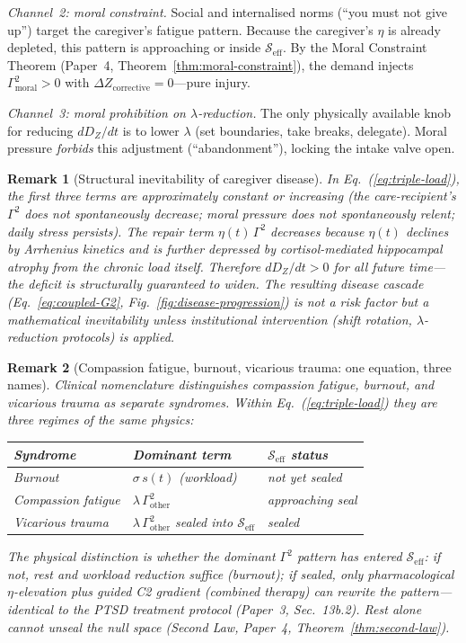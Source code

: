 \documentclass[aps,pre,twocolumn,superscriptaddress,floatfix]{revtex4-2}
\newtheorem{remark}{Remark}
\begin{document}
\emph{Channel~2: moral constraint.}
Social and internalised norms (``you must not give up'')
target the caregiver's fatigue pattern.
Because the caregiver's $\eta$ is already depleted,
this pattern is approaching or inside
$\mathcal{S}_{\text{eff}}$.
By the Moral Constraint Theorem
(Paper~4, Theorem~\ref{thm:moral-constraint}),
the demand injects $\Gamma_{\text{moral}}^2>0$
with $\Delta Z_{\text{corrective}}=0$---pure injury.

\emph{Channel~3: moral prohibition on $\lambda$-reduction.}
The only physically available knob for reducing
$dD_Z/dt$ is to lower $\lambda$ (set boundaries,
take breaks, delegate).
Moral pressure \emph{forbids} this adjustment
(``abandonment''), locking the intake valve open.

\begin{remark}[Structural inevitability of caregiver
disease]
\label{rem:caregiver-inevitable}
In Eq.~(\ref{eq:triple-load}), the first three terms
are approximately constant or increasing (the
care-recipient's $\Gamma^2$ does not spontaneously
decrease; moral pressure does not spontaneously relent;
daily stress persists).
The repair term $\eta(t)\,\Gamma^2$ decreases because
$\eta(t)$ declines by Arrhenius kinetics
and is further depressed by cortisol-mediated
hippocampal atrophy from the chronic load itself.
Therefore $dD_Z/dt > 0$ for all future time---the deficit
is \emph{structurally guaranteed} to widen.
The resulting disease cascade
(Eq.~\ref{eq:coupled-G2}, Fig.~\ref{fig:disease-progression})
is not a risk factor but a mathematical inevitability
unless institutional intervention (shift rotation,
$\lambda$-reduction protocols) is applied.
\end{remark}

\begin{remark}[Compassion fatigue, burnout, vicarious
trauma: one equation, three names]
\label{rem:fatigue-taxonomy}
Clinical nomenclature distinguishes compassion fatigue,
burnout, and vicarious trauma as separate syndromes.
Within Eq.~(\ref{eq:triple-load}) they are three
regimes of the same physics:
\begin{center}
\begin{tabular}{lll}
\toprule
Syndrome & Dominant term & $\mathcal{S}_{\text{eff}}$ status \\
\midrule
Burnout & $\sigma\,s(t)$ (workload) & not yet sealed \\
Compassion fatigue & $\lambda\,\Gamma_{\text{other}}^2$ &
  approaching seal \\
Vicarious trauma &
  $\lambda\,\Gamma_{\text{other}}^2$ sealed into
  $\mathcal{S}_{\text{eff}}$ & sealed \\
\bottomrule
\end{tabular}
\end{center}
The physical distinction is whether the dominant
$\Gamma^2$ pattern has entered $\mathcal{S}_{\text{eff}}$:
if not, rest and workload reduction suffice
(burnout); if sealed, only pharmacological $\eta$-elevation
plus guided C2 gradient (combined therapy) can rewrite
the pattern---identical to the PTSD treatment protocol
(Paper~3, Sec.~13b.2).
Rest alone cannot unseal the null space
(Second Law, Paper~4, Theorem~\ref{thm:second-law}).
\end{remark}
\end{document}

